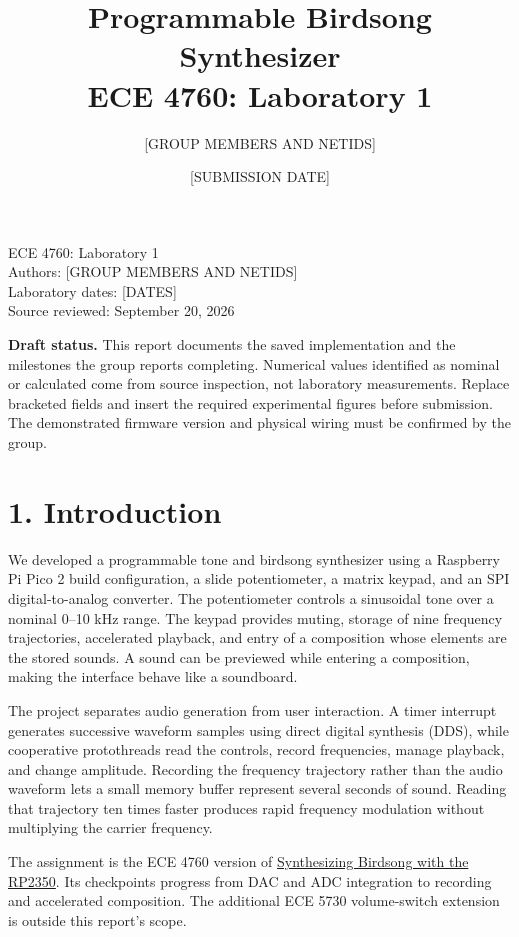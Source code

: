 \documentclass[11pt,letterpaper]{article}
\title{Programmable Birdsong Synthesizer\\\large ECE 4760: Laboratory 1}
\author{[GROUP MEMBERS AND NETIDS]}
\date{[SUBMISSION DATE]}
\begin{document}
\maketitle



ECE 4760: Laboratory 1\\
Authors: [GROUP MEMBERS AND NETIDS]\\
Laboratory dates: [DATES]\\
Source reviewed: September 20, 2026

\textbf{Draft status.} This report documents the saved implementation and the milestones the group reports completing. Numerical values identified as nominal or calculated come from source inspection, not laboratory measurements. Replace bracketed fields and insert the required experimental figures before submission. The demonstrated firmware version and physical wiring must be confirmed by the group.

\section*{1. Introduction}

We developed a programmable tone and birdsong synthesizer using a Raspberry Pi Pico 2 build configuration, a slide potentiometer, a matrix keypad, and an SPI digital-to-analog converter. The potentiometer controls a sinusoidal tone over a nominal 0--10 kHz range. The keypad provides muting, storage of nine frequency trajectories, accelerated playback, and entry of a composition whose elements are the stored sounds. A sound can be previewed while entering a composition, making the interface behave like a soundboard.

The project separates audio generation from user interaction. A timer interrupt generates successive waveform samples using direct digital synthesis (DDS), while cooperative protothreads read the controls, record frequencies, manage playback, and change amplitude. Recording the frequency trajectory rather than the audio waveform lets a small memory buffer represent several seconds of sound. Reading that trajectory ten times faster produces rapid frequency modulation without multiplying the carrier frequency.

The assignment is the ECE 4760 version of \href{https://vanhunteradams.com/Pico/Birds/Birdsong.html}{Synthesizing Birdsong with the RP2350}. Its checkpoints progress from DAC and ADC integration to recording and accelerated composition. The additional ECE 5730 volume-switch extension is outside this report's scope.
\end{document}
